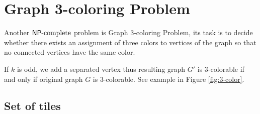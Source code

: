 \section{Graph 3-coloring Problem}



Another $\mathsf{NP}\textnormal{-complete}$ problem is Graph 3-coloring Problem, its task is to decide whether there exists an assignment of three colors to vertices of the graph so that no connected vertices have the same color.

If $k$ is odd, we add a separated vertex thus resulting graph $G'$ is 3-colorable if and only if original graph $G$ is 3-colorable. See example in Figure \ref{fig:3-color}.

\subsection*{Set of tiles}


